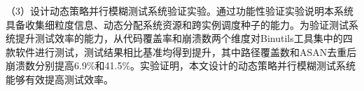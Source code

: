 \documentclass[master]{thesis-uestc}
\begin{document}
\begin{chineseabstract}
（3）设计动态策略并行模糊测试系统验证实验。通过功能性验证实验说明本系统具备收集细粒度信息、动态分配系统资源和跨实例调度种子的能力。为验证测试系统提升测试效率的能力，从代码覆盖率和崩溃数两个维度对Binutils工具集中的四款软件进行测试，测试结果相比基准均得到提升，其中路径覆盖数和ASAN去重后崩溃数分别提高6.9\%和41.5\%。实验证明，本文设计的动态策略并行模糊测试系统能够有效提高测试效率。

\end{chineseabstract}
\end{document}
